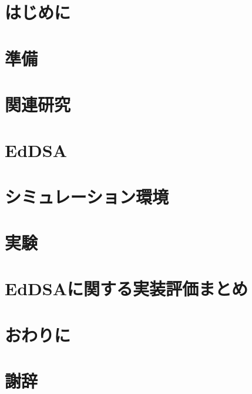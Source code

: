 \documentclass[
  luatex,
  paper=a4paper,
  fontsize=11pt,
  report,
  jlreq_notes,
]{jlreq}
\begin{document}

\tableofcontents

\clearpage

\chapter*{はじめに}

\chapter[　　 準備]{準備}

\chapter[　　 関連研究]{関連研究}

\chapter[　　 EdDSA]{EdDSA}

\chapter[　　 シミュレーション環境]{シミュレーション環境}

\chapter[　　 実験]{実験}

\chapter[　　 EdDSAに関する実装評価まとめ]{EdDSAに関する実装評価まとめ}

\chapter*{おわりに}

\chapter*{謝辞}



\end{document}
